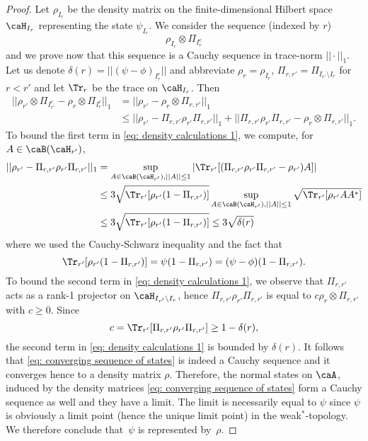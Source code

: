 \begin{proof}
	Let $\rho_{I_r}$ be the density matrix on the finite-dimensional Hilbert space $\caH_{I_r}$ representing the state $\psi_{I_r}$. 
	We consider the sequence (indexed by $r$)
	\begin{equation}\label{eq: converging sequence of states}
		\rho_{I_r} \otimes \Pi_{I_r^c}
	\end{equation}
	and we prove now that this sequence is a Cauchy sequence in trace-norm $||\cdot||_1$.
	Let us denote $\delta(r)=||(\psi-\phi)_{I_r^c}|| $ and abbreviate 
	$\rho_r=\rho_{I_r}$, $\Pi_{r,r'}=\Pi_{I_{r'}\setminus I_r}$ for $r<r'$ and let $\Tr_r$ be the trace on $\caH_{I_r}$. Then 
	\begin{align}
		|| \rho_{r'} \otimes \Pi_{I_{r'}^c}- \rho_r \otimes \Pi_{I_r^c} ||_1 &= 
		|| \rho_{r'} - \rho_r \otimes \Pi_{r,r'} ||_1 \\
		&\leq  
		|| \rho_{r'} - \Pi_{r,r'} \rho_{r'}\Pi_{r,r'} ||_1+ || \Pi_{r,r'} \rho_{r'}\Pi_{r,r'}-\rho_r \otimes \Pi_{r,r'} ||_1. \label{eq: density calculations 1}
	\end{align}
	To bound the first term in \eqref{eq: density calculations 1}, we compute, for $A\in \caB(\caH_{r'})$,
	\begin{align}
		|| \rho_{r'} - \Pi_{r,r'} \rho_{r'}\Pi_{r,r'} ||_1&=\sup_{A\in \caB(\caH_{r'}), ||A||\leq 1}
		|\Tr_{r'}[(\Pi_{r,r'} \rho_{r'}\Pi_{r,r'} - \rho_{r'})A] | \\
		&\leq 3  \sqrt{\Tr_{r'} [\rho_{r'} (1-\Pi_{r,r'})]} \sup_{A\in \caB(\caH_{r'}), ||A||\leq 1}  \sqrt{\Tr_{r'} [\rho_{r'}AA^*]}     \\
		& \leq 3  \sqrt{\Tr_{r'} [\rho_{r'} (1-\Pi_{r,r'})]} \leq 3 \sqrt{\delta(r)}
	\end{align}
	where we used the Cauchy-Schwarz inequality and the fact that 
	\begin{equation*}
		\Tr_{r'} [\rho_{r'} (1-\Pi_{r,r'})] = \psi(1-\Pi_{r,r'}) = (\psi - \phi)(1-\Pi_{r,r'}).
	\end{equation*}
	To bound the second term in \eqref{eq: density calculations 1}, we observe that $\Pi_{r,r'}$ acts as a rank-1 projector on $\caH_{I_{r'}\setminus I_r}$, hence 
	$\Pi_{r,r'} \rho_{r'}\Pi_{r,r'}$ is equal to $c\rho_r\otimes \Pi_{r,r'}$ with $c\geq 0$.  Since 
	$$
	c=\Tr_{r'} [\Pi_{r,r'} \rho_{r'}\Pi_{r,r'}]\geq 1-\delta(r),
	$$ 
	the second term in \eqref{eq: density calculations 1} is bounded by $\delta(r)$.  It follows that \eqref{eq: converging sequence of states} is indeed a Cauchy sequence and it converges hence to a density matrix $\rho$. Therefore, the normal states on $\caA$, induced by the density matrices \eqref{eq: converging sequence of states} form a Cauchy sequence as well and they have a limit. The limit is necessarily equal to $\psi$ since $\psi$ is obviously a limit point (hence the unique limit point)  in the weak$^*$-topology. We therefore conclude that~$\psi$ is represented by~$\rho$.  
\end{proof}

